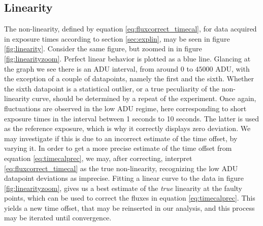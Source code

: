 \documentclass[../main.tex]{subfiles}
\begin{document}
		\subsection{Linearity}
		The non-linearity, defined by equation \ref{eq:fluxcorrect_timecal}, for data acquired in exposure times according to section \ref{sec:explin}, may be seen in figure \ref{fig:linearity}. Consider the same figure, but zoomed in in figure \ref{fig:linearityzoom}. Perfect linear behavior is plotted as a blue line. Glancing at the graph we see there is an ADU interval, from around $0$ to $45000$ ADU, with the exception of a couple of datapoints, namely the first and the sixth. Whether the sixth datapoint is a statistical outlier, or a true peculiarity of the non-linearity curve, should be determined by a repeat of the experiment. Once again, fluctuations are observed in the low ADU regime, here corresponding to short exposure times in the interval between 1 seconds to 10 seconds. The latter is used as the reference exposure, which is why it correctly displays zero deviation. We may investigate if this is due to an incorrect estimate of the time offset, by varying it. 
		In order to get a more precise estimate of the time offset from equation \ref{eq:timecalprec}, we may, after correcting, interpret \ref{eq:fluxcorrect_timecal} as the true non-linearity, recognizing the low ADU datapoint deviations as imprecise. Fitting a linear curve to the data in figure \ref{fig:linearityzoom}, gives us a best estimate of the \textit{true} linearity at the faulty points, which can be used to correct the fluxes in equation \ref{eq:timecalprec}. This yields a new time offset, that may be reinserted in our analysis, and this process may be iterated until convergence. 
		
\end{document}
